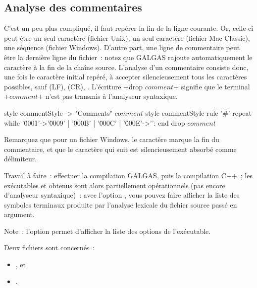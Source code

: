 \subsection{Analyse des commentaires}
C'est un peu plus compliqué, il faut repérer la fin de la ligne courante. Or, celle-ci peut être un seul caractère  (fichier Unix), un seul caractère  (fichier Mac Classic), une séquence  (fichier Windows). D'autre part, une ligne de commentaire peut être la dernière ligne du fichier~: notez que GALGAS rajoute automatiquement le caractère \tpp{\textquotesingle\textbackslash 0\textquotesingle} à la fin de la chaîne source. L'analyse d'un commentaire consiste donc, une fois le caractère initial \tpp{\textquotesingle\textbackslash\#\textquotesingle} repéré, à accepter silencieusement tous les caractères possibles, sauf  (LF),  (CR), . L’écriture \ggst+drop $comment$+ signifie que le terminal \ggst+$comment$+ n’est pas transmis à l’analyseur syntaxique.

\begin{galgas3}
style commentStyle -> "Comments"
$comment$ style commentStyle %
rule '#' {
  repeat
  while '\u0001'->'\u0009' | '\u000B' | '\u000C' | '\u000E'->'\uFFFD':
  end
  drop $comment$
}
\end{galgas3}

Remarquez que pour un fichier Windows, le caractère  marque la fin du commentaire, et que le caractère  qui suit est silencieusement absorbé comme délimiteur.

Travail à faire~: effectuer la compilation GALGAS, puis la compilation C++~; les exécutables  et  obtenus sont alors partiellement opérationnels (pas encore d’analyseur syntaxique)~: avec l'option , vous pouvez faire afficher la liste des symboles terminaux produite par l'analyse lexicale du fichier source passé en argument.

Note~: l'option  permet d'afficher la liste des options de l'exécutable.


Deux fichiers sont concernés~:
\begin{itemize}
  \item {}, et
  \item {}.
\end{itemize}

